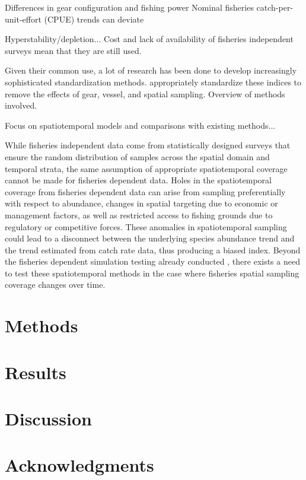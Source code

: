 \documentclass[authoryear,preprint,review,12pt]{elsarticle}
\begin{document}
Differences in gear configuration and fishing power Nominal fisheries catch-per-unit-effort (CPUE) trends can deviate   

Hyperstability/depletion...
Cost and lack of availability of fisheries independent surveys mean that they are still used.

Given their common use, a lot of research has been done to develop increasingly sophisticated standardization methods. appropriately standardize these indices to remove the effects of gear, vessel, and spatial sampling. Overview of methods involved.

Focus on spatiotemporal models and comparisons with existing methods...

While fisheries independent data come from statistically designed surveys that ensure the random distribution of samples across the spatial domain and temporal strata, the same assumption of appropriate spatiotemporal coverage cannot be made for fisheries dependent data. Holes in the spatiotemporal coverage from fisheries dependent data can arise from sampling preferentially with respect to abundance, changes in spatial targeting due to economic or management factors, as well as restricted access to fishing grounds due to regulatory or competitive forces. These anomalies in spatiotemporal sampling could lead to a disconnect between the underlying species abundance trend and the trend estimated from catch rate data, thus producing a biased index. Beyond the fisheries dependent simulation testing already conducted \citep{gruss_evaluation_2019,zhou_catch_2019}, there exists a need to test these spatiotemporal methods in the case where fisheries spatial sampling coverage changes over time.  

\section{Methods}\label{Methods}

\section{Results}\label{Results}

\section{Discussion}\label{Discussion}

\section{Acknowledgments}\label{Ack}


\end{document}

